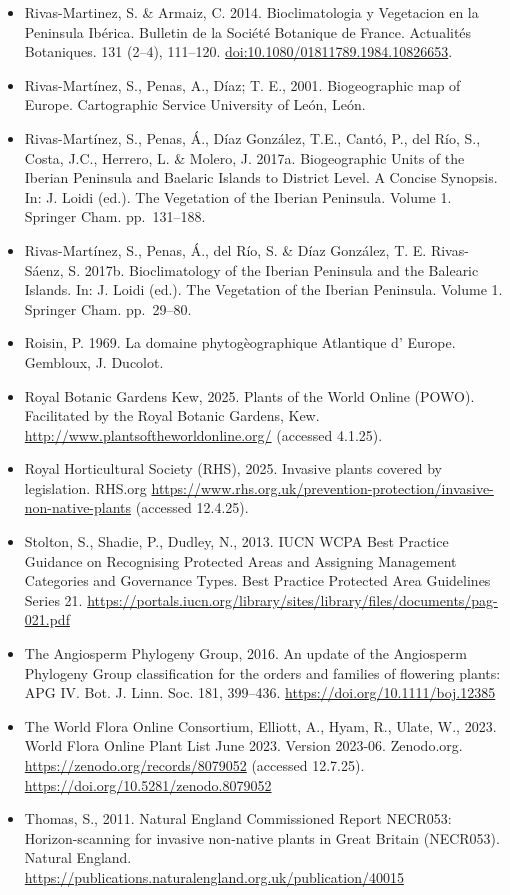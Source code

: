 \documentclass[
]{article}
\begin{document}
\begin{itemize}
\item
  Rivas-Martinez, S. \& Armaiz, C. 2014. Bioclimatologia y Vegetacion en
  la Peninsula Ibérica. Bulletin de la Société Botanique de France.
  Actualités Botaniques. 131 (2--4), 111--120.
  \url{doi:10.1080/01811789.1984.10826653}.
\item
  Rivas-Martínez, S., Penas, A., Díaz; T. E., 2001. Biogeographic map of
  Europe. Cartographic Service University of León, León.
\item
  Rivas-Martínez, S., Penas, Á., Díaz González, T.E., Cantó, P., del
  Río, S., Costa, J.C., Herrero, L. \& Molero, J. 2017a. Biogeographic
  Units of the Iberian Peninsula and Baelaric Islands to District Level.
  A Concise Synopsis. In: J. Loidi (ed.). The Vegetation of the Iberian
  Peninsula. Volume 1. Springer Cham. pp.~131--188.
\item
  Rivas-Martínez, S., Penas, Á., del Río, S. \& Díaz González, T. E.
  Rivas-Sáenz, S. 2017b. Bioclimatology of the Iberian Peninsula and the
  Balearic Islands. In: J. Loidi (ed.). The Vegetation of the Iberian
  Peninsula. Volume 1. Springer Cham. pp.~29--80.
\item
  Roisin, P. 1969. La domaine phytogèographique Atlantique d' Europe.
  Gembloux, J. Ducolot.
\item
  Royal Botanic Gardens Kew, 2025. Plants of the World Online (POWO).
  Facilitated by the Royal Botanic Gardens, Kew.
  \url{http://www.plantsoftheworldonline.org/} (accessed 4.1.25).
\item
  Royal Horticultural Society (RHS), 2025. Invasive plants covered by
  legislation. RHS.org
  \url{https://www.rhs.org.uk/prevention-protection/invasive-non-native-plants}
  (accessed 12.4.25).
\item
  Stolton, S., Shadie, P., Dudley, N., 2013. IUCN WCPA Best Practice
  Guidance on Recognising Protected Areas and Assigning Management
  Categories and Governance Types. Best Practice Protected Area
  Guidelines Series 21.
  \url{https://portals.iucn.org/library/sites/library/files/documents/pag-021.pdf}
\item
  The Angiosperm Phylogeny Group, 2016. An update of the Angiosperm
  Phylogeny Group classification for the orders and families of
  flowering plants: APG IV. Bot. J. Linn. Soc. 181, 399--436.
  \url{https://doi.org/10.1111/boj.12385}
\item
  The World Flora Online Consortium, Elliott, A., Hyam, R., Ulate, W.,
  2023. World Flora Online Plant List June 2023. Version 2023-06.
  Zenodo.org. \url{https://zenodo.org/records/8079052} (accessed
  12.7.25). \url{https://doi.org/10.5281/zenodo.8079052}
\item
  Thomas, S., 2011. Natural England Commissioned Report NECR053:
  Horizon-scanning for invasive non-native plants in Great Britain
  (NECR053). Natural England.
  \url{https://publications.naturalengland.org.uk/publication/40015}
\end{itemize}
\end{document}
